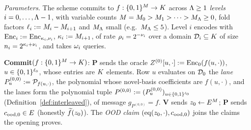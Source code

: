 \begin{protocol}\label{fig:protocol}
\ \par\smallskip
\emph{Parameters.} The scheme commits to $f : \{0,1\}^{M} \to K$ across $\Lambda \ge 1$ \emph{levels} $i = 0, \dots, \Lambda-1$, with variable counts $M = M_0 > M_1 > \dots > M_\Lambda \ge 0$, fold factors $\ell_i := M_i - M_{i+1}$ and $M_\Lambda$ small (e.g.\ $M_\Lambda \le 5$). Level $i$ encodes with $\mathrm{Enc}_i := \mathrm{Enc}_{\kappa_i, \nu_i}$, $\kappa_i := M_{i+1}$, of rate $\rho_i = 2^{-\nu_i}$ over a domain $\mathcal{D}_i \subseteq K$ of size $n_i = 2^{\kappa_i + \nu_i}$, and takes $\omega_i$ queries.

\smallskip
\textbf{Commit}$(f : \{0,1\}^{M} \to K)$: $\mathbf{P}$ sends the oracle $Z^{(0)}[u, \cdot] := \mathrm{Enc}_0(f(u, \cdot))$, $u \in \{0,1\}^{\ell_0}$, whose entries are $K$ elements. Row $u$ evaluates on $\mathcal{D}_0$ the \emph{lane} $P^{(0,0)}_u:=\mathcal{P}_{f(u,\cdot)}$, the polynomial whose novel-basis coefficients are $f(u,\cdot)$, and the lanes form the polynomial tuple $P^{(0,0)}:=(P^{(0,0)}_u)_{u\in\{0,1\}^{\ell_0}}$ (Definition~\ref{def:interleaved}), of message $g_{P^{(0,0)}}=f$. $\mathbf{V}$ sends $z_0\leftarrow E^{M}$; $\mathbf{P}$ sends $c_{\mathrm{ood},0}\in E$ (honestly $\widetilde{f}(z_0)$). The \emph{OOD claim} $(\operatorname{eq}(z_0,\cdot),c_{\mathrm{ood},0})$ joins the claims the opening proves.


\end{protocol}
